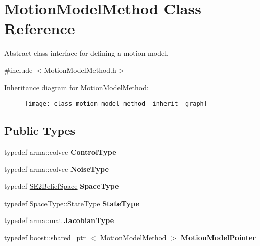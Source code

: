 \hypertarget{class_motion_model_method}{\section{\-Motion\-Model\-Method \-Class \-Reference}
\label{class_motion_model_method}
}


\-Abstract class interface for defining a motion model.  




{\ttfamily \#include $<$\-Motion\-Model\-Method.\-h$>$}



\-Inheritance diagram for \-Motion\-Model\-Method\-:\nopagebreak
\begin{figure}[H]
\begin{center}
\leavevmode
\texttt{[image: class\_motion\_model\_method\_\_inherit\_\_graph]}
\end{center}
\end{figure}
\subsection*{\-Public \-Types}
\begin{DoxyCompactItemize}
\item 
\hypertarget{class_motion_model_method_a3d2d250cadace8b47d5eca028a2220e4}{typedef arma\-::colvec {\bfseries \-Control\-Type}}\label{class_motion_model_method_a3d2d250cadace8b47d5eca028a2220e4}

\item 
\hypertarget{class_motion_model_method_aecf04875853e2ecbebc66eb720adc63b}{typedef arma\-::colvec {\bfseries \-Noise\-Type}}\label{class_motion_model_method_aecf04875853e2ecbebc66eb720adc63b}

\item 
\hypertarget{class_motion_model_method_ada60008f50c4ec1f48956bf99fa846ed}{typedef \hyperlink{class_s_e2_belief_space}{\-S\-E2\-Belief\-Space} {\bfseries \-Space\-Type}}\label{class_motion_model_method_ada60008f50c4ec1f48956bf99fa846ed}

\item 
\hypertarget{class_motion_model_method_a15b3c3801cb64f85bfff7d088d276d91}{typedef \hyperlink{class_s_e2_belief_space_1_1_state_type}{\-Space\-Type\-::\-State\-Type} {\bfseries \-State\-Type}}\label{class_motion_model_method_a15b3c3801cb64f85bfff7d088d276d91}

\item 
\hypertarget{class_motion_model_method_a2c6d9dc15fc37a1d5079f72c4114ebed}{typedef arma\-::mat {\bfseries \-Jacobian\-Type}}\label{class_motion_model_method_a2c6d9dc15fc37a1d5079f72c4114ebed}

\item 
\hypertarget{class_motion_model_method_a94a8bd757d2cfb258a47cdd69079e506}{typedef boost\-::shared\-\_\-ptr\*
$<$ \hyperlink{class_motion_model_method}{\-Motion\-Model\-Method} $>$ {\bfseries \-Motion\-Model\-Pointer}}\label{class_motion_model_method_a94a8bd757d2cfb258a47cdd69079e506}

\end{DoxyCompactItemize}
